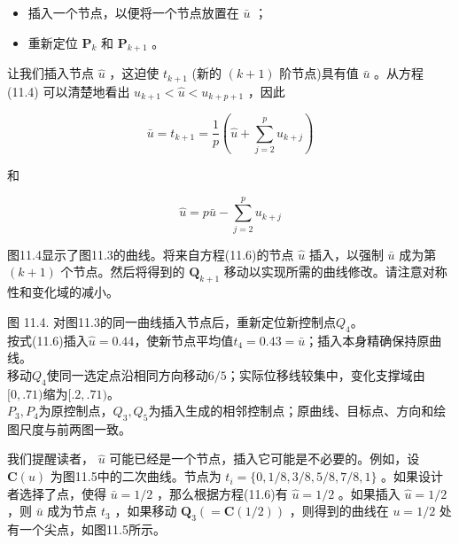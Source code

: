 \documentclass[../main.tex]{subfiles}
\begin{document}
\begin{itemize}
\item 插入一个节点，以便将一个节点放置在 \(\bar{u}\) ；
\end{itemize}

\begin{itemize}
\item 重新定位 \({\mathbf{P}}_{k}\) 和 \({\mathbf{P}}_{k + 1}\) 。
\end{itemize}

让我们插入节点 \(\widehat{u}\) ，这迫使 \({t}_{k + 1}\) (新的 \(\left( {k + 1}\right)\) 阶节点)具有值 \(\bar{u}\) 。从方程 (11.4) 可以清楚地看出 \({u}_{k + 1} < \widehat{u} < {u}_{k + p + 1}\) ，因此

\[
\bar{u} = {t}_{k + 1} = \frac{1}{p}\left( {\widehat{u} + \mathop{\sum }\limits_{{j = 2}}^{p}{u}_{k + j}}\right)
\]

和

\[
\widehat{u} = p\bar{u} - \mathop{\sum }\limits_{{j = 2}}^{p}{u}_{k + j} \tag{11.6}
\]



图11.4显示了图11.3的曲线。将来自方程(11.6)的节点 \(\widehat{u}\) 插入，以强制 \(\bar{u}\) 成为第 \(\left( {k + 1}\right)\) 个节点。然后将得到的 \({\mathbf{Q}}_{k + 1}\) 移动以实现所需的曲线修改。请注意对称性和变化域的减小。

\begin{center}
\begin{minipage}{26cm}
\vspace*{.6\baselineskip}
\centering
{}
\par\smallskip
图 11.4. 对图11.3的同一曲线插入节点后，重新定位新控制点$Q_4$。\\
按式(11.6)插入$\widehat u=0.44$，使新节点平均值$t_4=0.43=\bar u$；插入本身精确保持原曲线。\\
移动$Q_4$使同一选定点沿相同方向移动$6/5$；实际位移线较集中，变化支撑域由$[0,.71)$缩为$[.2,.71)$。\\
$P_3,P_4$为原控制点，$Q_3,Q_5$为插入生成的相邻控制点；原曲线、目标点、方向和绘图尺度与前两图一致。
\end{minipage}
\end{center}

我们提醒读者， \(\widehat{u}\) 可能已经是一个节点，插入它可能是不必要的。例如，设 \(\mathbf{C}\left( u\right)\) 为图11.5中的二次曲线。节点为 \({t}_{i} = \{ 0,1/8,3/8,5/8,7/8,1\}\) 。如果设计者选择了点，使得 \(\bar{u} = 1/2\) ，那么根据方程(11.6)有 \(\widehat{u} = 1/2\) 。如果插入 \(\widehat{u} = 1/2\) ，则 \(\bar{u}\) 成为节点 \({t}_{3}\) ，如果移动 \({\mathbf{Q}}_{3}\left( { = \mathbf{C}\left( {1/2}\right) }\right)\) ，则得到的曲线在 \(u = 1/2\) 处有一个尖点，如图11.5所示。
\end{document}
